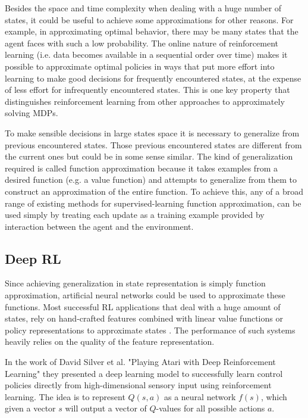 \documentclass{article}
\begin{document}
Besides the space and time complexity when dealing with a huge number of states, it could be useful to achieve some approximations for other reasons. For example, in approximating optimal behavior, there may be many states that the agent faces with such a low probability. The online nature of reinforcement learning (i.e. data becomes available in a sequential order over time) makes it possible to approximate optimal policies in ways that put more effort into learning to make good decisions for frequently encountered states, at the expense of less effort for infrequently encountered states. This is one key property that distinguishes reinforcement learning from other approaches to approximately solving MDPs.

To make sensible decisions in large states space it is necessary to generalize from previous encountered states. Those previous encountered states are different from the current ones but could be in some sense similar. The kind of generalization required is called function approximation because it takes examples from a desired function (e.g. a value function) and attempts to generalize from them to construct an approximation of the entire function. To achieve this, any of a broad range of existing methods for supervised-learning function approximation, can be used simply by treating each update as a training example provided by interaction between the agent and the environment.

\subsection{ Deep RL}
Since achieving generalization in state representation is simply function approximation, artificial neural networks could be used to approximate these functions. 
Most successful RL applications that deal with a huge amount of states, rely on hand-crafted features combined with linear value functions or policy representations to approximate states \cite{mnih2013atari}. The performance of such systems heavily relies on the quality of the feature representation.

In the work of David Silver et al. "Playing Atari with Deep Reinforcement Learning" \cite{mnih2013atari} they presented a deep learning model to successfully learn control policies directly from high-dimensional sensory input using reinforcement learning. The idea is to represent $Q(s,a)$ as a neural network  $f(s)$, which given a vector $s$ will output a vector of $Q$-values for all possible actions $a$.
\end{document}
